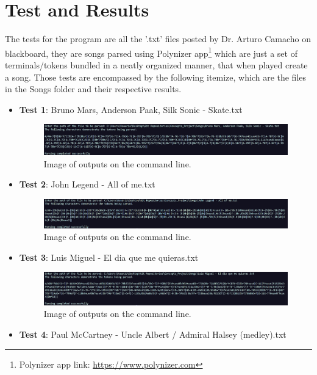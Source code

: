 \documentclass{article}
\begin{document}
\section{Test and Results}
The tests for the program are all the '.txt' files posted by Dr. Arturo Camacho on blackboard, they are songs parsed using Polynizer app\footnote{Polynizer app link: \url{https://www.polynizer.com}} which are just a set of terminals/tokens bundled in a neatly organized manner, that when played create a song. Those tests are encompassed by the following itemize, which are the files in the Songs folder and their respective results. 
\begin{itemize}
    \item \textbf{Test 1}: Bruno Mars, Anderson Paak, Silk Sonic - Skate.txt
    \begin{figure}[H]
        \centering
        \includegraphics[width=1\textwidth]{Image_SkateParsed.png}
        \caption{Image of outputs on the command line.}
    \end{figure}
    \item \textbf{Test 2}: John Legend - All of me.txt
    \begin{figure}[H]
        \centering
        \includegraphics[width=1\textwidth]{Image_AllOfMeParsed.png}
        \caption{Image of outputs on the command line.}
    \end{figure}
    \item \textbf{Test 3}: Luis Miguel - El dia que me quieras.txt
    \begin{figure}[H]
        \centering
        \includegraphics[width=1\textwidth]{Image_ElDiaQueMeQuiera.png}
        \caption{Image of outputs on the command line.}
    \end{figure}
    \item \textbf{Test 4}: Paul McCartney - Uncle Albert / Admiral Halsey (medley).txt
    \begin{figure}[H]

\end{figure}
\end{itemize}
\end{document}
